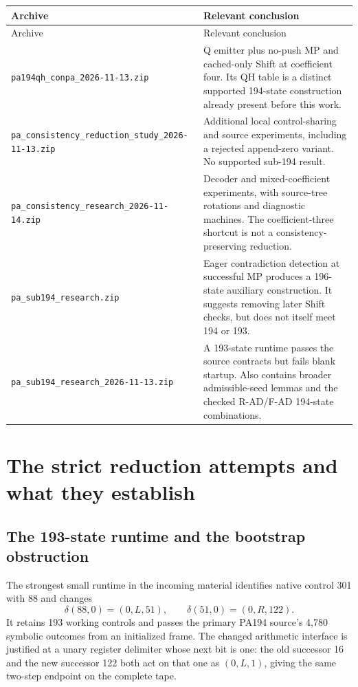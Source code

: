 \documentclass[11pt,letterpaper]{article}
\newcommand{\file}[1]{\texttt{\nolinkurl{#1}}}
\begin{document}
\begin{longtable}{@{}>{\raggedright\arraybackslash}p{}>{\raggedright\arraybackslash}p{}@{}}
\toprule Archive & Relevant conclusion\\\midrule\endfirsthead
\toprule Archive & Relevant conclusion\\\midrule\endhead
\file{pa194qh_conpa_2026-11-13.zip} & Q emitter plus no-push MP and cached-only
 Shift at coefficient four. Its QH table is a distinct supported 194-state
 construction already present before this work.\\
\file{pa_consistency_reduction_study_2026-11-13.zip} & Additional local
 control-sharing and source experiments, including a rejected append-zero
 variant. No supported sub-194 result.\\
\file{pa_consistency_research_2026-11-14.zip} & Decoder and mixed-coefficient
 experiments, with source-tree rotations and diagnostic machines. The
 coefficient-three shortcut is not a consistency-preserving reduction.\\
\file{pa_sub194_research.zip} & Eager contradiction detection at successful
 MP produces a 196-state auxiliary construction. It suggests removing
 later Shift checks, but does not itself meet 194 or 193.\\
\file{pa_sub194_research_2026-11-13.zip} & A 193-state runtime passes the source
 contracts but fails blank startup. Also contains broader admissible-seed
 lemmas and the checked R-AD/F-AD 194-state combinations.\\
\bottomrule
\end{longtable}

\section{The strict reduction attempts and what they establish}

\subsection{The 193-state runtime and the bootstrap obstruction}

The strongest small runtime in the incoming material identifies native
control 301 with 88 and changes
\[
 \delta(88,0)=(0,L,51),\qquad
 \delta(51,0)=(0,R,122).
\]
It retains 193 working controls and passes the primary PA194 source's
4,780 symbolic outcomes from an initialized frame. The changed arithmetic
interface is justified at a unary register delimiter whose next bit is one:
the old successor 16 and the new successor 122 both act on that one as
$(0,L,1)$, giving the same two-step endpoint on the complete tape.
\end{document}
